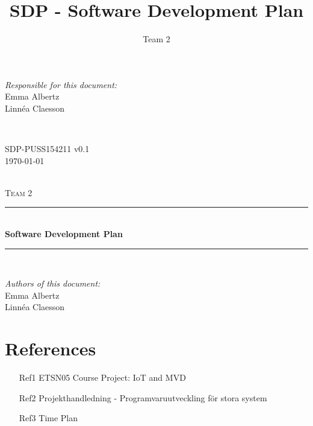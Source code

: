 \documentclass[a4paper]{article}
\title{SDP - Software Development Plan}
\author{Team 2}
\begin{document}
\begin{titlepage}
\newcommand{\HRule}{\rule{\linewidth}{0.5mm}}

\begin{minipage}{0.5\textwidth}
\begin{flushleft} %
\textit{Responsible for this document:}\\
Emma Albertz \\
Linnéa Claesson
\end{flushleft}
\end{minipage}
~
\begin{minipage}{0.4\textwidth}
\begin{flushright}
SDP-PUSS154211 v0.1 \\
\today
\end{flushright}
\end{minipage}\\[3cm]

\centering
\textsc{\LARGE Team 2}\\[0.5cm]

\HRule \\[0.4cm]
{ \huge \bfseries Software Development Plan}\\[0.4cm] %
\HRule \\[1.5cm]

\vfill
\begin{flushleft}
\textit{Authors of this document:}\\
Emma Albertz \\
Linnéa Claesson
\end{flushleft}



\end{titlepage}
\setcounter{tocdepth}{2}
\tableofcontents
\newpage
{}

\section{References}
\begin{itemize}
\item[Ref1] ETSN05 Course Project: IoT and MVD
\item[Ref2] Projekthandledning - Programvaruutveckling för stora system
\item[Ref3] Time Plan
\end{itemize}
\end{document}
